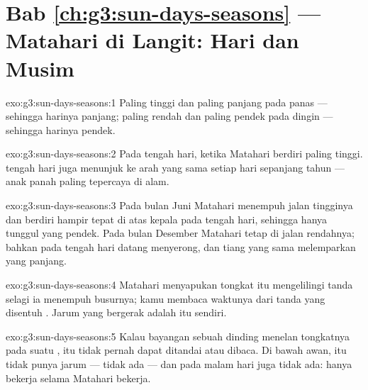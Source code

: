 \section*{Bab \ref{ch:g3:sun-days-seasons} --- Matahari di Langit: Hari dan Musim}

\begin{solution}{exo:g3:sun-days-seasons:1}
Paling tinggi dan paling panjang pada  panas --- sehingga harinya
panjang; paling rendah dan paling pendek pada  dingin ---
sehingga harinya pendek.
\end{solution}

\begin{solution}{exo:g3:sun-days-seasons:2}
Pada tengah hari, ketika Matahari berdiri paling tinggi. 
tengah hari juga menunjuk ke arah yang sama setiap hari sepanjang
tahun --- anak panah paling tepercaya di alam.
\end{solution}

\begin{solution}{exo:g3:sun-days-seasons:3}
Pada bulan Juni Matahari menempuh jalan tingginya dan berdiri hampir
tepat di atas kepala pada tengah hari, sehingga  hanya
tunggul yang pendek. Pada bulan Desember Matahari tetap di jalan
rendahnya; bahkan pada tengah hari  datang menyerong, dan
tiang yang sama melemparkan  yang panjang.
\end{solution}

\begin{solution}{exo:g3:sun-days-seasons:4}
Matahari menyapukan  tongkat itu mengelilingi tanda 
selagi ia menempuh busurnya; kamu membaca waktunya dari tanda yang
disentuh . Jarum yang bergerak adalah 
itu sendiri.
\end{solution}

\begin{solution}{exo:g3:sun-days-seasons:5}
Kalau bayangan sebuah dinding menelan tongkatnya pada suatu , 
itu tidak pernah dapat ditandai atau dibaca. Di bawah awan,  itu
tidak punya jarum --- tidak ada  --- dan pada malam hari
juga tidak ada:  hanya bekerja selama Matahari bekerja.
\end{solution}


